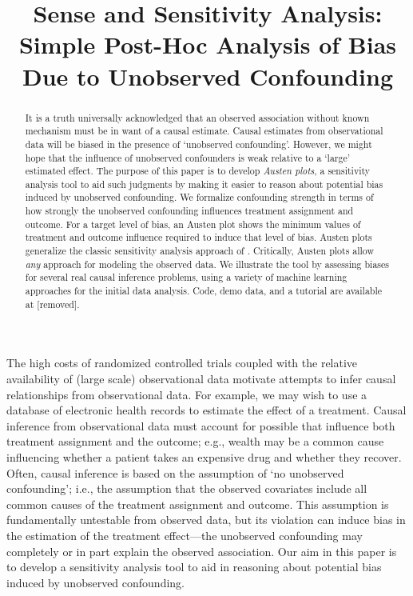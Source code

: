 \documentclass{article}
\title{Sense and Sensitivity Analysis: Simple Post-Hoc Analysis of Bias Due to Unobserved Confounding}
\date{}
\begin{document}
\maketitle

\begin{abstract}
  It is a truth universally acknowledged that an observed association without known mechanism must be in want of a causal estimate.
  Causal estimates from observational data will be biased in the presence of `unobserved confounding'.
%
%
   However, we might hope that the influence of unobserved confounders is weak
   relative to a `large' estimated effect.
  The purpose of this paper is to develop \emph{Austen plots}, a sensitivity analysis tool to aid such judgments
  by making it easier to reason about potential bias induced by unobserved confounding.
  We formalize confounding strength in terms of how strongly the unobserved confounding influences treatment assignment and outcome.
  For a target level of bias, an Austen plot shows the minimum values of treatment and outcome influence
  required to induce that level of bias.
  Austen plots generalize the classic sensitivity analysis approach of \citet{Imbens:2003}.
  Critically, Austen plots allow \emph{any} approach for modeling the observed data. %
  We illustrate the tool by assessing biases for several real causal inference problems, using a variety of
  machine learning approaches for the initial data analysis. Code, demo data, and a tutorial are available at [removed].
%
%
%
%
%
%
%
%
\end{abstract}

%


The high costs of randomized controlled trials coupled with the relative availability of
(large scale) observational data motivate attempts to infer causal relationships from observational data.
For example, we may wish to use a database of electronic health records to estimate the effect of a treatment.
Causal inference from observational data must account for possible  that influence
both treatment assignment and the outcome; e.g., wealth may be a common cause influencing whether a patient
takes an expensive drug and whether they recover.
Often, causal inference is based on the assumption of `no unobserved confounding'; i.e.,
the assumption that the observed covariates include all common causes of the treatment assignment and outcome.
This assumption is fundamentally untestable from observed data, but its violation can induce bias in the estimation
of the treatment effect---the unobserved confounding may completely or in part explain the observed association.
Our aim in this paper is to develop a sensitivity analysis tool to aid in reasoning about potential bias induced by unobserved confounding.
\end{document}
